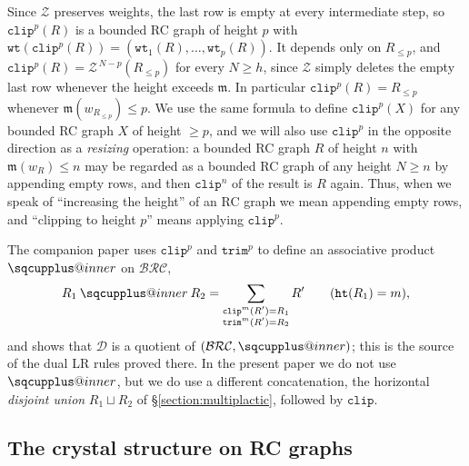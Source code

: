 \documentclass{amsart}
\makeatletter
\newcommand{\sqcupplus@inner}[2]{%
  \vcenter{\hbox{\ooalign{%
    \hfil$\m@th#1\sqcup$\hfil\cr
    \hfil\raisebox{0.15ex}{$\m@th#1\scriptscriptstyle+$}\hfil\cr
  }}}%
}
\newcommand{\sqcupplus}{\mathbin{\mathpalette\sqcupplus@inner\relax}}
\theoremstyle{definition}
\theoremstyle{remark}
\numberwithin{equation}{subsection}
\newcommand{\wof}[1]{w_{#1}}
\newcommand{\wtt}{\mathtt{wt}}
\newcommand{\trm}{\mathtt{trim}}
\newcommand{\zeromap}{\mathcal{Z}}
\newcommand{\hr}{\mathtt{ht}}
\newcommand{\clp}{\mathtt{clip}}
\newcommand{\BRC}{\mathcal{BRC}}
\newcommand{\dcoma}{\mathcal{D}}
\newcommand{\maxd}{\mathfrak{m}}
\makeatother
\begin{document}
Since $\zeromap$ preserves weights, the last row is empty at every intermediate step, so $\clp^p(R)$ is a bounded RC graph of height $p$ with $\wtt(\clp^p(R))=(\wtt_1(R),\ldots,\wtt_p(R))$. It depends only on $R_{\leq p}$, and $\clp^p(R)=\zeromap^{\,N-p}(R_{\leq p})$ for every $N\geq h$, since $\zeromap$ simply deletes the empty last row whenever the height exceeds $\maxd$. In particular $\clp^p(R)=R_{\leq p}$ whenever $\maxd(\wof{R_{\leq p}})\leq p$. We use the same formula to define $\clp^p(X)$ for any bounded RC graph $X$ of height $\geq p$, and we will also use $\clp^p$ in the opposite direction as a \emph{resizing} operation: a bounded RC graph $R$ of height $n$ with $\maxd(\wof R)\leq n$ may be regarded as a bounded RC graph of any height $N\geq n$ by appending empty rows, and then $\clp^n$ of the result is $R$ again. Thus, when we speak of ``increasing the height'' of an RC graph we mean appending empty rows, and ``clipping to height $p$'' means applying $\clp^p$.

The companion paper uses $\clp^p$ and $\trm^p$ to define an associative product $\sqcupplus$ on $\BRC$,
$$R_1\sqcupplus R_2 = \sum_{\substack{\clp^m(R')=R_1\\ \trm^m(R')=R_2}}R'\qquad(\hr(R_1)=m),$$
and shows that $\dcoma$ is a quotient of $(\BRC,\sqcupplus)$; this is the source of the dual LR rules proved there. In the present paper we do not use $\sqcupplus$, but we do use a different concatenation, the horizontal \emph{disjoint union} $R_1\sqcup R_2$ of \S\ref{section:multiplactic}, followed by $\clp$.

\subsection{The crystal structure on RC graphs}\label{section:crystalbackground}
\end{document}
